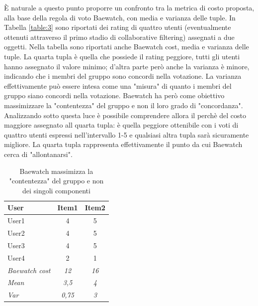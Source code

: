 \documentclass[letterpaper]{article}
\begin{document}
\`E naturale a questo punto proporre un confronto tra la metrica di costo proposta, alla base della regola di voto Baewatch, con media e varianza delle tuple. In Tabella \ref{table:3} sono riportati dei rating di quattro utenti (eventualmente ottenuti attraverso il primo stadio di collaborative filtering) assegnati a due oggetti. Nella tabella sono riportati anche Baewatch cost, media e varianza delle tuple. La quarta tupla è quella che possiede il rating peggiore, tutti gli utenti hanno assegnato il valore minimo; d'altra parte però anche la varianza è minore, indicando che i membri del gruppo sono concordi nella votazione. La varianza effettivamente può essere intesa come una "misura" di quanto i membri del gruppo siano concordi nella votazione. Baewatch ha però come obiettivo massimizzare la "contentezza" del gruppo e non il loro grado di "concordanza". Analizzando sotto questa luce è possibile comprendere allora il perchè del costo maggiore assegnato all quarta tupla: è quella peggiore ottenibile con i voti di quattro utenti espressi nell'intervallo 1-5 e qualsiasi altra tupla sarà sicuramente migliore. La quarta tupla rappresenta effettivamente il punto da cui Baewatch cerca di "allontanarsi".


\begin{table}[h]
\centering
\begin{tabular}{|l|c|c|}
\hline
\textbf{User}          & \multicolumn{1}{l|}{\textbf{Item1}} & \multicolumn{1}{l|}{\textbf{Item2}} \\ \hline
User1                  & 4                                   & 5                                   \\ \hline
User2                  & 4                                   & 5                                   \\ \hline
User3                  & 4                                   & 5                                   \\ \hline
User4                  & 2                                   & 1                                   \\ \hline
\textit{Baewatch cost} & \textit{12}                         & \textit{16}                         \\ \hline
\textit{Mean}          & \textit{3,5}                        & \textit{4}                          \\ \hline
\textit{Var}           & \textit{0,75}                       & \textit{3}                          \\ \hline
\end{tabular}
\caption{Baewatch massimizza la "contentezza" del gruppo e non dei singoli componenti}
\label{table:4}
\end{table}
\end{document}
